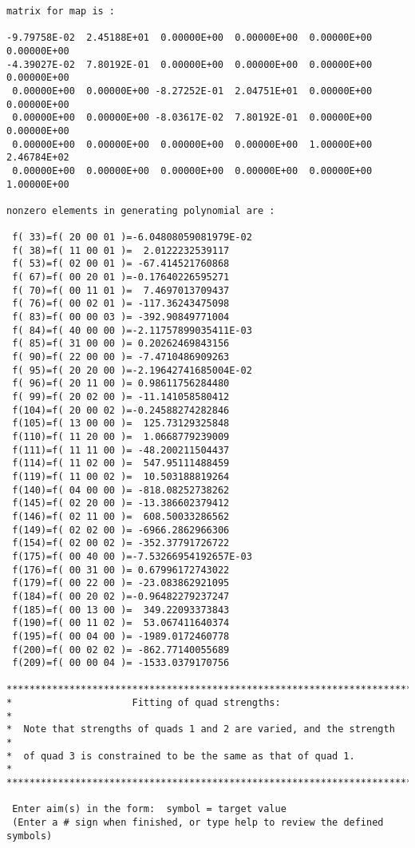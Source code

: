 \begin{footnotesize}
\begin{verbatim}
matrix for map is :

-9.79758E-02  2.45188E+01  0.00000E+00  0.00000E+00  0.00000E+00  0.00000E+00
-4.39027E-02  7.80192E-01  0.00000E+00  0.00000E+00  0.00000E+00  0.00000E+00
 0.00000E+00  0.00000E+00 -8.27252E-01  2.04751E+01  0.00000E+00  0.00000E+00
 0.00000E+00  0.00000E+00 -8.03617E-02  7.80192E-01  0.00000E+00  0.00000E+00
 0.00000E+00  0.00000E+00  0.00000E+00  0.00000E+00  1.00000E+00  2.46784E+02
 0.00000E+00  0.00000E+00  0.00000E+00  0.00000E+00  0.00000E+00  1.00000E+00

nonzero elements in generating polynomial are :

 f( 33)=f( 20 00 01 )=-6.04808059081979E-02
 f( 38)=f( 11 00 01 )=  2.0122232539117
 f( 53)=f( 02 00 01 )= -67.414521760868
 f( 67)=f( 00 20 01 )=-0.17640226595271
 f( 70)=f( 00 11 01 )=  7.4697013709437
 f( 76)=f( 00 02 01 )= -117.36243475098
 f( 83)=f( 00 00 03 )= -392.90849771004
 f( 84)=f( 40 00 00 )=-2.11757899035411E-03
 f( 85)=f( 31 00 00 )= 0.20262469843156
 f( 90)=f( 22 00 00 )= -7.4710486909263
 f( 95)=f( 20 20 00 )=-2.19642741685004E-02
 f( 96)=f( 20 11 00 )= 0.98611756284480
 f( 99)=f( 20 02 00 )= -11.141058580412
 f(104)=f( 20 00 02 )=-0.24588274282846
 f(105)=f( 13 00 00 )=  125.73129325848
 f(110)=f( 11 20 00 )=  1.0668779239009
 f(111)=f( 11 11 00 )= -48.200211504437
 f(114)=f( 11 02 00 )=  547.95111488459
 f(119)=f( 11 00 02 )=  10.503188819264
 f(140)=f( 04 00 00 )= -818.08252738262
 f(145)=f( 02 20 00 )= -13.386602379412
 f(146)=f( 02 11 00 )=  608.50033286562
 f(149)=f( 02 02 00 )= -6966.2862966306
 f(154)=f( 02 00 02 )= -352.37791726722
 f(175)=f( 00 40 00 )=-7.53266954192657E-03
 f(176)=f( 00 31 00 )= 0.67996172743022
 f(179)=f( 00 22 00 )= -23.083862921095
 f(184)=f( 00 20 02 )=-0.96482279237247
 f(185)=f( 00 13 00 )=  349.22093373843
 f(190)=f( 00 11 02 )=  53.067411640374
 f(195)=f( 00 04 00 )= -1989.0172460778
 f(200)=f( 00 02 02 )= -862.77140055689
 f(209)=f( 00 00 04 )= -1533.0379170756

*************************************************************************
*                     Fitting of quad strengths:                        *
*  Note that strengths of quads 1 and 2 are varied, and the strength    *
*  of quad 3 is constrained to be the same as that of quad 1.           *
*************************************************************************

 Enter aim(s) in the form:  symbol = target value
 (Enter a # sign when finished, or type help to review the defined symbols)
\end{verbatim}
\end{footnotesize}

